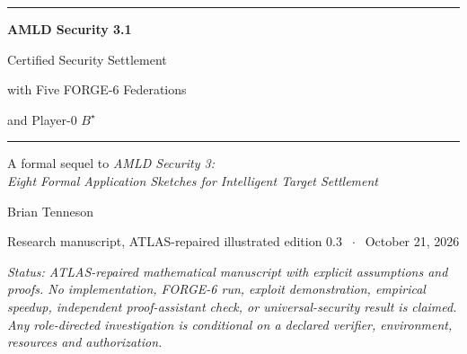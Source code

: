 \documentclass[11pt,letterpaper,oneside]{book}
\theoremstyle{definition}
\theoremstyle{remark}
\begin{document}
\frontmatter
\begin{titlepage}
\centering
\vspace*{1.15in}
{\color{teal}\rule{0.63\textwidth}{1.6pt}}\par\vspace{.27in}
{\sffamily\bfseries\Huge\color{ink} AMLD Security 3.1\par}
\vspace{.20in}
{\sffamily\LARGE Certified Security Settlement\par}
\vspace{.10in}
{\sffamily\Large with Five FORGE-6 Federations\par}
\vspace{.08in}
{\sffamily\Large and Player-0 $B^\star$\par}
\vspace{.30in}
{\color{teal}\rule{0.63\textwidth}{1.6pt}}\par
\vspace{.38in}
{\large A formal sequel to \emph{AMLD Security 3:\\ Eight Formal Application Sketches for Intelligent Target Settlement}}\par
\vspace{.55in}
{\Large Brian Tenneson}\par
\vspace{.10in}
{\color{muted}\small Research manuscript, ATLAS-repaired illustrated edition 0.3 $\;\cdot\;$ October 21, 2026}\par
\vspace{.28in}

\vfill
\begin{minipage}{.84\textwidth}\small\itshape
Status: ATLAS-repaired mathematical manuscript with explicit assumptions and proofs. No implementation,
FORGE-6 run, exploit demonstration, empirical speedup, independent proof-assistant
check, or universal-security result is claimed. Any role-directed investigation is
conditional on a declared verifier, environment, resources and authorization.
\end{minipage}
\end{titlepage}
\end{document}
